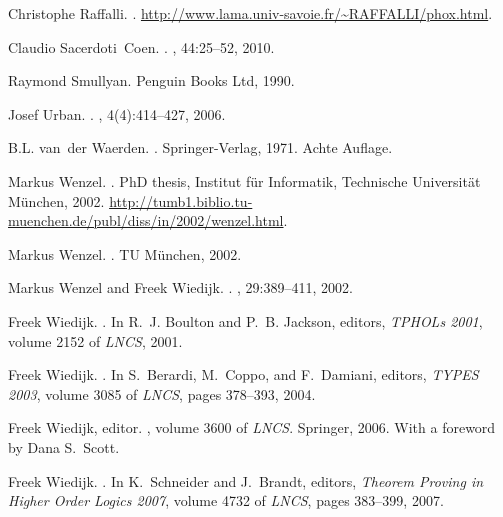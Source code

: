 \documentclass{LMCS}
\begin{document}
\begin{thebibliography}{10}
Christophe Raffalli.
.
\newblock \url{http://www.lama.univ-savoie.fr/~RAFFALLI/phox.html}.

Claudio Sacerdoti~Coen.
.
, 44:25--52, 2010.

Raymond Smullyan.
\newblock Penguin Books Ltd, 1990.

Josef Urban.
.
, 4(4):414--427, 2006.

B.L. van~der Waerden.
.
\newblock Springer-Verlag, 1971.
\newblock Achte Auflage.

Markus Wenzel.
.
\newblock PhD thesis, {Institut f\"ur Informatik, Technische Universit\"at
  M\"unchen}, 2002.
\newblock
  \url{http://tumb1.biblio.tu-muenchen.de/publ/diss/in/2002/wenzel.html}.

Markus Wenzel.
.
\newblock TU M{\"u}nchen, 2002.

Markus Wenzel and Freek Wiedijk.
.
, 29:389--411, 2002.

Freek Wiedijk.
.
\newblock In R.~J. Boulton and P.~B. Jackson, editors, {\em {TPHOLs} 2001},
  volume 2152 of {\em LNCS}, 2001.

Freek Wiedijk.
.
\newblock In S.~Berardi, M.~Coppo, and F.~Damiani, editors, {\em TYPES 2003},
  volume 3085 of {\em LNCS}, pages 378--393, 2004.

Freek Wiedijk, editor.
, volume 3600 of {\em
  LNCS}.
\newblock Springer, 2006.
\newblock With a foreword by Dana S.~Scott.

Freek Wiedijk.
.
\newblock In K.~Schneider and J.~Brandt, editors, {\em Theorem Proving in
  Higher Order Logics 2007}, volume 4732 of {\em LNCS}, pages 383--399, 2007.

\end{thebibliography}
\end{document}
